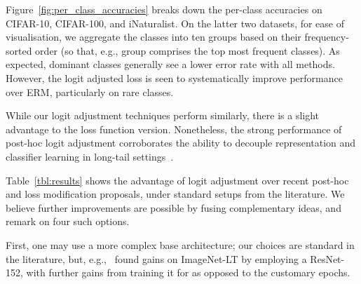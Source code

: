 {Figure~\ref{fig:per_class_accuracies} breaks down the per-class accuracies on CIFAR-10, CIFAR-100, and iNaturalist.
On the latter two datasets, for ease of visualisation,
we aggregate the classes into ten groups based on their frequency-sorted order (so that, e.g., group  comprises the top  most frequent classes).
As expected,
dominant classes generally see a lower error rate with all methods.
However,
the logit adjusted loss is seen to systematically improve performance over ERM, particularly on rare classes.

While our logit adjustment techniques perform similarly,
there is a slight advantage to the loss function version.
Nonetheless, the strong performance of post-hoc logit adjustment corroborates the ability to decouple representation and classifier learning in long-tail settings~\citep{Zhang:2019}.

Table~\ref{tbl:results} shows the advantage of logit adjustment over recent post-hoc and loss modification proposals,
under standard setups from the literature.
We believe further improvements are possible by fusing complementary ideas, and remark on four such options.

First,
one may use a more complex base architecture;
our choices are standard in the literature,
but, e.g.,~\citet{Kang:2020} found gains on ImageNet-LT by employing a ResNet-152,
with further gains from training it for  as opposed to the customary  epochs.
}
